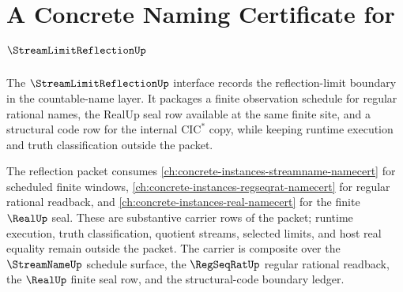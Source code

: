 \chapter{A Concrete Naming Certificate for $\StreamLimitReflectionUp$}
\label{ch:concrete-instances-streamlimitreflection-namecert}

The $\StreamLimitReflectionUp$ interface records the reflection-limit boundary in the countable-name layer. It packages a finite observation schedule for regular rational names, the RealUp seal row available at the same finite site, and a structural code row for the internal $\mathrm{CIC}^{*}$ copy, while keeping runtime execution and truth classification outside the packet.

The reflection packet consumes \autoref{ch:concrete-instances-streamname-namecert} for scheduled finite windows, \autoref{ch:concrete-instances-regseqrat-namecert} for regular rational readback, and \autoref{ch:concrete-instances-real-namecert} for the finite $\RealUp$ seal. These are substantive carrier rows of the packet; runtime execution, truth classification, quotient streams, selected limits, and host real equality remain outside the packet.
The carrier is composite over the $\StreamNameUp$ schedule surface, the $\RegSeqRatUp$ regular rational readback, the $\RealUp$ finite seal row, and the structural-code boundary ledger.

